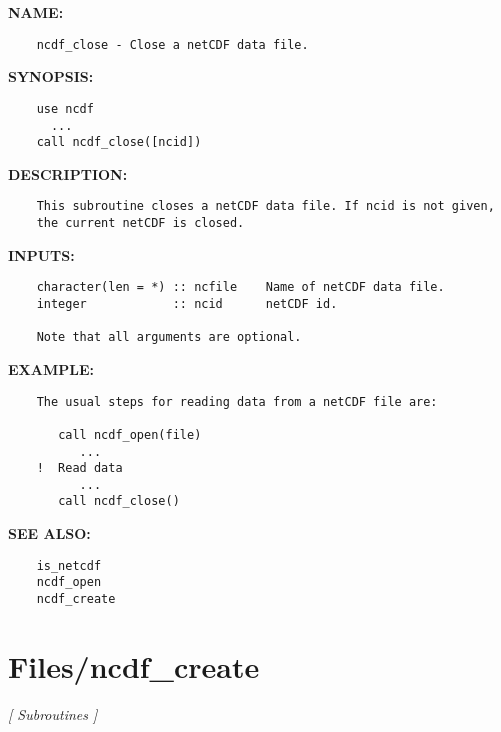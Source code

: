 \label{ch:robo59}
\label{ch:Files_ncdf_close}
\textbf{NAME:}\hspace{0.08in}\begin{Verbatim}
    ncdf_close - Close a netCDF data file.
\end{Verbatim}
\textbf{SYNOPSIS:}\hspace{0.08in}\begin{Verbatim}
    use ncdf
      ...
    call ncdf_close([ncid])
\end{Verbatim}
\textbf{DESCRIPTION:}\hspace{0.08in}\begin{Verbatim}
    This subroutine closes a netCDF data file. If ncid is not given,
    the current netCDF is closed.
\end{Verbatim}
\textbf{INPUTS:}\hspace{0.08in}\begin{Verbatim}
    character(len = *) :: ncfile    Name of netCDF data file.
    integer            :: ncid      netCDF id.

    Note that all arguments are optional.
\end{Verbatim}
\textbf{EXAMPLE:}\hspace{0.08in}\begin{Verbatim}
    The usual steps for reading data from a netCDF file are:

       call ncdf_open(file)
          ...
    !  Read data
          ...
       call ncdf_close()
\end{Verbatim}
\textbf{SEE ALSO:}\hspace{0.08in}\begin{Verbatim}
    is_netcdf
    ncdf_open
    ncdf_create
\end{Verbatim}
\section{Files/ncdf\_create}
\textsl{[ Subroutines ]}

